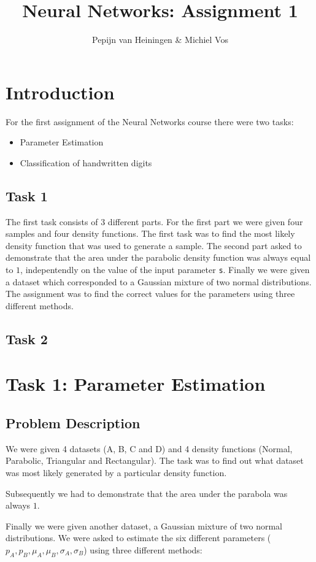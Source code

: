 \documentclass{article}
\title{Neural Networks: Assignment 1}
\author{Pepijn van Heiningen \& Michiel Vos}
\begin{document}
\maketitle

\section{Introduction}
For the first assignment of the Neural Networks course there were two tasks:
\begin{itemize}
\item Parameter Estimation
\item Classification of handwritten digits
\end{itemize}

\subsection{Task 1}
The first task consists of $3$ different parts. For the first part we were given four samples and four density functions. The first task was to find the most likely density function that was used to generate a sample. 
The second part asked to demonstrate that the area under the parabolic density function was always equal to $1$, indepentendly on the value of the input parameter \verb+s+.
Finally we were given a dataset which corresponded to a Gaussian mixture of two normal distributions. The assignment was to find the correct values for the parameters using three different methods.

\subsection{Task 2}

\section{Task 1: Parameter Estimation}
\subsection{Problem Description}
We were given 4 datasets (A, B, C and D) and 4 density functions (Normal, Parabolic, Triangular and Rectangular). The task was to find out what dataset was most likely generated by a particular density function. 

Subsequently we had to demonstrate that the area under the parabola was always $1$.

Finally we were given another dataset, a Gaussian mixture of two normal distributions. We were asked to estimate the six different parameters ($p_A, p_B, \mu_A, \mu_B, \sigma_A, \sigma_B$) using three different methods:
\end{document}
